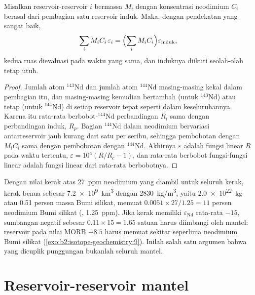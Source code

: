 \begin{proposition}\label{prop:b2:isotope-geochemistry:mass-balance}
Misalkan reservoir-reservoir $i$ bermassa $M_i$ dengan konsentrasi neodimium $C_i$ berasal dari
pembagian satu reservoir induk. Maka, dengan pendekatan yang sangat baik,
\[
  \sum_i M_i C_i\, \varepsilon_i = \Bigl(\sum_i M_i C_i\Bigr) \varepsilon_{\text{induk}},
\]
kedua ruas dievaluasi pada waktu yang sama, dan induknya diikuti seolah-olah
tetap utuh.
\end{proposition}

\begin{proof}
Jumlah atom $^{143}\mathrm{Nd}$ dan jumlah atom $^{144}\mathrm{Nd}$
masing-masing kekal dalam pembagian itu, dan masing-masing kemudian bertambah (untuk
$^{143}\mathrm{Nd}$) atau tetap (untuk $^{144}\mathrm{Nd}$) di setiap reservoir tepat seperti
dalam keseluruhannya. Karena itu rata-rata berbobot-$^{144}\mathrm{Nd}$ perbandingan $R_i$ sama dengan
perbandingan induk, $R_p$. Bagian $^{144}\mathrm{Nd}$ dalam neodimium bervariasi
antarreservoir jauh kurang dari satu per seribu, sehingga pembobotan dengan
$M_iC_i$ sama dengan pembobotan dengan $^{144}\mathrm{Nd}$. Akhirnya $\varepsilon$ adalah
fungsi linear $R$ pada waktu tertentu, $\varepsilon = 10^4(R/R_c - 1)$, dan
rata-rata berbobot fungsi-fungsi linear adalah fungsi linear dari rata-rata berbobotnya.
\end{proof}

Dengan nilai kerak atas \qty{27}{ppm} neodimium yang diambil untuk seluruh
kerak, kerak benua sebesar \qty{7.2e9}{km^3} dengan \qty{2830}{kg/m^3}, yaitu
\qty{2.0e22}{kg} atau 0.51 persen massa Bumi silikat, memuat
$0.0051\times27/1.25 = 11$ persen neodimium Bumi silikat (, \qty{1.25}{ppm}). Jika kerak memiliki $\varepsilon_{\mathrm{Nd}}$ rata-rata
$-15$, sumbangan negatif sebesar $0.11\times15 = 1.65$ satuan harus
diimbangi oleh mantel: reservoir pada nilai MORB $+8.5$ harus memuat
sekitar seperlima neodimium Bumi silikat (\cref{exo:b2:isotope-geochemistry:9}). Inilah salah satu
argumen bahwa  yang dicuplik punggungan bukanlah seluruh
mantel.

\section{Reservoir-reservoir mantel}


